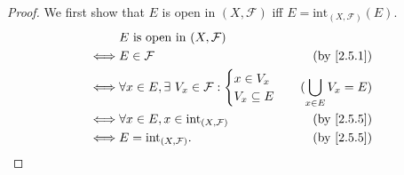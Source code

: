 \begin{proof}
  We first show that \(E\) is open in \((X, \mathcal{F})\) iff \(E = \text{int}_{(X, \mathcal{F})}(E)\).
  \begin{align*}
         & E \text{ is open in } (X, \mathcal{F})                                                    \\
    \iff & E \in \mathcal{F}                                             & \text{(by \cref{2.5.1})}  \\
    \iff & \forall x \in E, \exists\ V_x \in \mathcal{F} : \begin{cases}
                                                             x \in V_x \\
                                                             V_x \subseteq E
                                                           \end{cases} & (\bigcup_{x \in E} V_x = E) \\
    \iff & \forall x \in E, x \in \text{int}_{(X, \mathcal{F})}          & \text{(by \cref{2.5.5})}  \\
    \iff & E = \text{int}_{(X, \mathcal{F})}.                            & \text{(by \cref{2.5.5})}
  \end{align*}


\end{proof}

